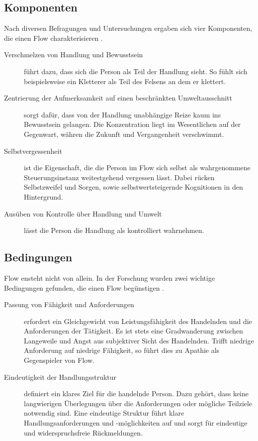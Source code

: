 \subsection{Komponenten}
Nach diversen Befragungen und Untersuchungen ergaben
sich vier Komponenten, die einen Flow charakterisieren
\cite{csikszentmihalyi:1993}.
\begin{description}
\item[Verschmelzen von Handlung und Bewusstsein] führt dazu, dass sich die
Person als Teil der Handlung sieht. So fühlt sich beispielsweise ein Kletterer
als Teil des Felsens an dem er klettert.
\item[Zentrierung der Aufmerksamkeit auf einen beschränkten Umweltausschnitt]
sorgt dafür, dass von der Handlung unabhängige Reize kaum ins Bewusstsein
gelangen. Die Konzentration liegt im Wesentlichen auf der Gegenwart, währen die
Zukunft und Vergangenheit verschwimmt.
\item[Selbstvergessenheit] ist die Eigenschaft, die die Person im Flow sich
selbst als wahrgenommene Steuerungsinstanz weitestgehend vergessen lässt. Dabei
rücken Selbstzweifel und Sorgen, sowie selbstwertsteigernde Kognitionen in den
Hintergrund.
\item[Ausüben von Kontrolle über Handlung und Umwelt] lässt die Person die
Handlung als kontrolliert wahrnehmen.
\end{description}

\subsection{Bedingungen}
Flow ensteht nicht von allein. In der Forschung wurden zwei wichtige Bedingungen
gefunden, die einen Flow begünstigen \cite{csikszentmihalyi:1993}.
\begin{description}
\item[Passung von Fähigkeit und Anforderungen] erfordert ein Gleichgewicht von
Leistungsfähigkeit des Handelnden und die Anforderungen der Tätigkeit. Es ist
stets eine Gradwanderung zwischen Langeweile und Angst aus subjektiver Sicht
des Handelnden. Trifft niedrige Anforderung auf niedrige Fähigkeit, so führt
dies zu Apathie als Gegenspieler von Flow.
\item[Eindeutigkeit der Handlungsstruktur] definiert ein klares Ziel für die
handelnde Person. Dazu gehört, dass keine langwierigen Überlegungen über die
Anforderungen oder mögliche Teilziele notwendig sind. Eine eindeutige Struktur
führt klare Handlungsanforderungen und -möglichkeiten auf und sorgt für
eindeutige und widerspruchsfreie Rückmeldungen. 
\end{description}



